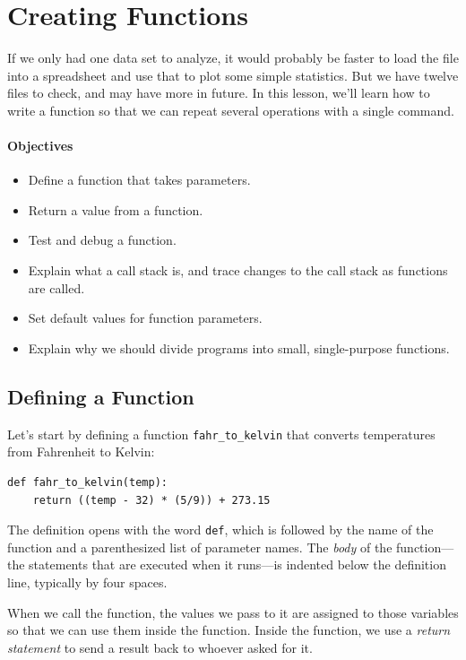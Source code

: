 \documentclass[]{book}
\newcommand{\gdef}[2]{\emph{#2}}
\begin{document}
\section{Creating Functions}

If we only had one data set to analyze, it would probably be faster to
load the file into a spreadsheet and use that to plot some simple
statistics. But we have twelve files to check, and may have more in
future. In this lesson, we'll learn how to write a function so that we
can repeat several operations with a single command.

\mbox{}\paragraph{Objectives}

\begin{itemize}
\item
  Define a function that takes parameters.
\item
  Return a value from a function.
\item
  Test and debug a function.
\item
  Explain what a call stack is, and trace changes to the call stack as
  functions are called.
\item
  Set default values for function parameters.
\item
  Explain why we should divide programs into small, single-purpose
  functions.
\end{itemize}

\subsection{Defining a Function}

Let's start by defining a function \texttt{fahr\_to\_kelvin} that
converts temperatures from Fahrenheit to Kelvin:

\begin{verbatim}
def fahr_to_kelvin(temp):
    return ((temp - 32) * (5/9)) + 273.15
\end{verbatim}

The definition opens with the word \texttt{def}, which is followed by
the name of the function and a parenthesized list of parameter names.
The \gdef{g:function-body}{body} of the function---the statements
that are executed when it runs---is indented below the definition line,
typically by four spaces.

When we call the function, the values we pass to it are assigned to
those variables so that we can use them inside the function. Inside the
function, we use a \gdef{g:return-statement}{return statement} to
send a result back to whoever asked for it.
\end{document}
